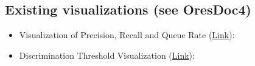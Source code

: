 \documentclass[12pt,a4paper]{article}
\begin{document}
\subsection{Existing visualizations (see OresDoc4)}
\begin{itemize}
\item Visualization of Precision, Recall and Queue Rate (\href{https://blog.insightdatascience.com/visualizing-machine-learning-thresholds-to-make-better-business-decisions-4ab07f823415}{Link}):
\item Discrimination Threshold Visualization (\href{http://www.scikit-yb.org/en/latest/api/classifier/threshold.html}{Link}):
\end{itemize}
%
%
\end{document}
